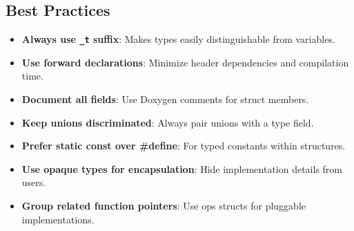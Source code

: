 \subsection{Best Practices}

\begin{itemize}
    \item \textbf{Always use \texttt{\_t} suffix}: Makes types easily distinguishable from variables.
    \item \textbf{Use forward declarations}: Minimize header dependencies and compilation time.
    \item \textbf{Document all fields}: Use Doxygen comments for struct members.
    \item \textbf{Keep unions discriminated}: Always pair unions with a type field.
    \item \textbf{Prefer static const over \#define}: For typed constants within structures.
    \item \textbf{Use opaque types for encapsulation}: Hide implementation details from users.
    \item \textbf{Group related function pointers}: Use ops structs for pluggable implementations.
\end{itemize}

